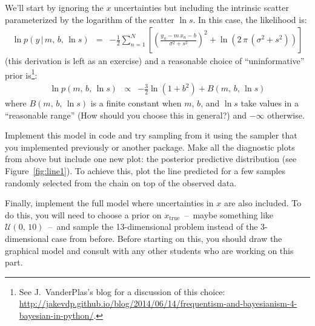 \documentclass[letterpaper,12pt,preprint]{hack_aastex}
\begin{document}
We'll start by ignoring the $x$ uncertainties but including the intrinsic
scatter parameterized by the logarithm of the scatter $\ln s$.
In this case, the likelihood is:
\begin{eqnarray}
\ln p (y\,|\,m,\,b,\,\ln s) &=& -\frac{1}{2} \sum_{n=1}^N\left[
\left(\frac{y_n-m\,x_n-b}{\sigma^2 + s^2}\right)^2 + \ln(2\,\pi\,(\sigma^2 +
s^2))\right]
\end{eqnarray}
(this derivation is left as an exercise)
and a reasonable choice of ``uninformative'' prior is\footnote{See
J.~VanderPlas's blog for a discussion of this choice:
\url{http://jakevdp.github.io/blog/2014/06/14/frequentism-and-bayesianism-4-bayesian-in-python/}.}:
\begin{eqnarray}
\ln p(m,\,b,\,\ln s) &\propto& -\frac{3}{2}\ln(1+b^2) + B(m,\,b,\,\ln s)
\end{eqnarray}
where $B(m,\,b,\,\ln s)$ is a finite constant when $m$, $b$, and $\ln s$ take
values in a ``reasonable range'' (How should you choose this in general?) and
$-\infty$ otherwise.

Implement this model in code and try sampling from it using the sampler that
you implemented previously or another package.
Make all the diagnostic plots from above but include one new plot: the
posterior predictive distribution (see Figure~\ref{fig:line1}).
To achieve this, plot the line predicted for a few samples randomly selected
from the chain on top of the observed data.

Finally, implement the full model where uncertainties in $x$ are also
included.
To do this, you will need to choose a prior on $x_\mathrm{true}$~--~maybe
something like $\mathcal{U}(0,\,10)$~--~and sample the 13-dimensional problem
instead of the 3-dimensional case from before.
Before starting on this, you should draw the graphical model and consult with
any other students who are working on this part.

\newpage





\end{document}
